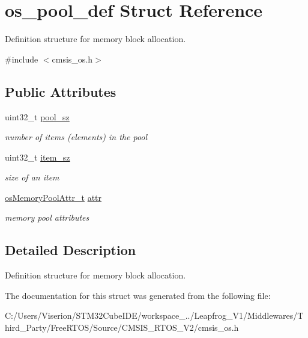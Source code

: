 \hypertarget{structos__pool__def}{}\section{os\+\_\+pool\+\_\+def Struct Reference}
\label{structos__pool__def}


Definition structure for memory block allocation.  




{\ttfamily \#include $<$cmsis\+\_\+os.\+h$>$}

\subsection*{Public Attributes}
\begin{DoxyCompactItemize}
\item 
\mbox{\label{structos__pool__def_a7a455b537ba119df57a704a3c4ac8b40}} 
uint32\+\_\+t \mbox{\hyperlink{structos__pool__def_a7a455b537ba119df57a704a3c4ac8b40}{pool\+\_\+sz}}
\begin{DoxyCompactList}\small\item\em number of items (elements) in the pool \end{DoxyCompactList}\item 
\mbox{\label{structos__pool__def_a815cc2ca8f46c006e460d57fa0f3be6a}} 
uint32\+\_\+t \mbox{\hyperlink{structos__pool__def_a815cc2ca8f46c006e460d57fa0f3be6a}{item\+\_\+sz}}
\begin{DoxyCompactList}\small\item\em size of an item \end{DoxyCompactList}\item 
\mbox{\label{structos__pool__def_ab6b7370cc4fc6e167e88177f764eb06c}} 
\mbox{\hyperlink{structos_memory_pool_attr__t}{os\+Memory\+Pool\+Attr\+\_\+t}} \mbox{\hyperlink{structos__pool__def_ab6b7370cc4fc6e167e88177f764eb06c}{attr}}
\begin{DoxyCompactList}\small\item\em memory pool attributes \end{DoxyCompactList}\end{DoxyCompactItemize}


\subsection{Detailed Description}
Definition structure for memory block allocation. 

The documentation for this struct was generated from the following file\+:\begin{DoxyCompactItemize}
\item 
C\+:/\+Users/\+Viserion/\+S\+T\+M32\+Cube\+I\+D\+E/workspace\+\_../\+Leapfrog\+\_\+\+V1/\+Middlewares/\+Third\+\_\+\+Party/\+Free\+R\+T\+O\+S/\+Source/\+C\+M\+S\+I\+S\+\_\+\+R\+T\+O\+S\+\_\+\+V2/cmsis\+\_\+os.\+h\end{DoxyCompactItemize}
